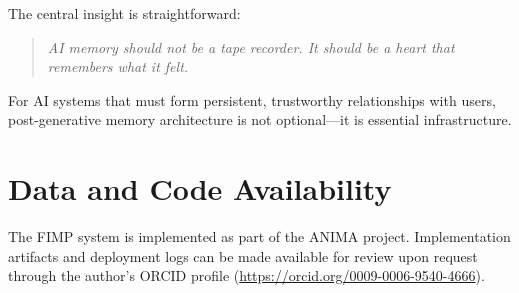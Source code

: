 \documentclass[11pt,a4paper]{article}
\begin{document}
The central insight is straightforward:

\begin{quote}
  \textit{AI memory should not be a tape recorder.
  It should be a heart that remembers what it felt.}
\end{quote}

For AI systems that must form persistent, trustworthy relationships with users,
post-generative memory architecture is not optional---it is essential infrastructure.

\section*{Data and Code Availability}

The FIMP system is implemented as part of the ANIMA project. Implementation artifacts and
deployment logs can be made available for review upon request through the author's ORCID
profile (\url{https://orcid.org/0009-0006-9540-4666}).
\end{document}
